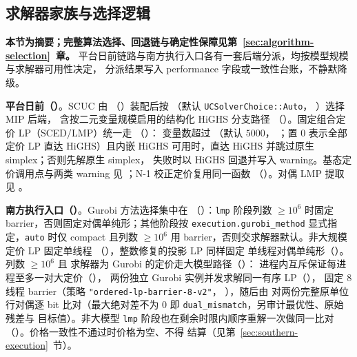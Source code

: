 \documentclass[UTF8,fontset=fandol,a4paper,11pt]{ctexart}
\begin{document}
\subsection{求解器家族与选择逻辑}
\textbf{本节为摘要；完整算法选择、回退链与确定性保障见第~\ref{sec:algorithm-selection}~章。}
平台日前链路与南方执行入口各有一套后端分派，均按模型规模与求解器可用性决定，
分派结果写入 performance 字段或一致性台账，不静默降级。

\textbf{平台日前（）}。SCUC 由
（）装配后按
（默认 \texttt{UCSolverChoice::Auto}，
）选择 MIP 后端，
含按二元变量规模启用的结构化 HiGHS 分支路径
（）。固定组合定价 LP（SCED/LMP）统一走
（）：
变量数超过 （默认 $5000$，
；置 $0$ 表示全部定价 LP 直达
HiGHS）且内嵌 HiGHS 可用时，直达 HiGHS 并跳过原生 simplex；否则先解原生 simplex，
失败时以 HiGHS 回退并写入 warning。基态定价调用点与两类 warning 见
；N-1 校正定价复用同一函数
（）。对偶 LMP 提取见
。

\textbf{南方执行入口（）}。Gurobi 方法选择集中在
（）：\texttt{lmp}
阶段列数 $\ge10^{6}$ 时固定 barrier，否则固定对偶单纯形；其他阶段按
\texttt{execution.gurobi\_method} 显式指定，\texttt{auto} 时仅 compact 且列数 $\ge10^{6}$
用 barrier，否则交求解器默认。非大规模定价 LP 固定单线程
（），整数修复的投影 LP 同样固定
单线程对偶单纯形（）。列数 $\ge10^{6}$ 且
求解器为 Gurobi 的定价走大模型路径（）：
进程内互斥保证每进程至多一对大定价（），
两份独立 Gurobi 实例并发求解同一有序 LP（），
固定 8 线程 barrier（策略 \texttt{"ordered-lp-barrier-8-v2"}，
），随后由
 对两份完整原单位
行对偶逐 bit 比对（最大绝对差不为 $0$ 即 \texttt{dual\_mismatch}，另审计最优性、原始残差与
目标值）。非大模型 \texttt{lmp} 阶段也在剩余时限内顺序重解一次做同一比对
（）。价格一致性不通过时价格为空、不得
结算（见第~\ref{sec:southern-execution}~节）。
\end{document}
